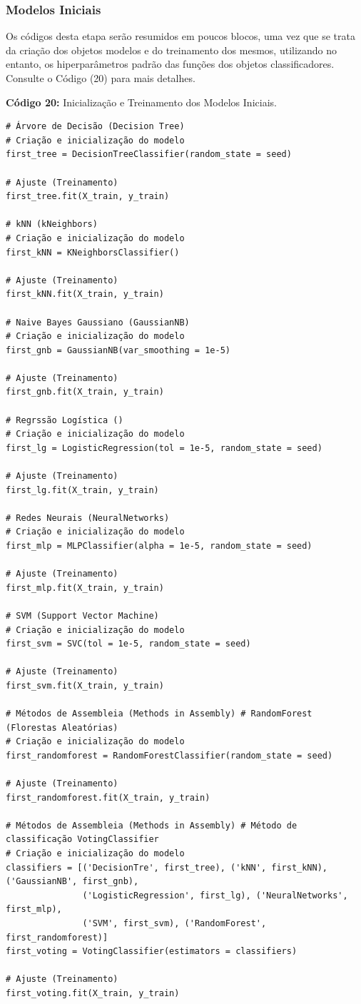 \documentclass[a4paper,12pt]{article} %
\begin{document}
\subsubsection{Modelos Iniciais} \label{section:3.4.1}
Os códigos desta etapa serão resumidos em poucos blocos, uma vez que se trata da criação dos objetos modelos e do treinamento dos mesmos, utilizando no entanto, os hiperparâmetros padrão das funções dos objetos classificadores. Consulte o Código (20) para mais detalhes.
\begin{center}
\textbf{Código 20:} Inicialização e Treinamento dos Modelos Iniciais.
\begin{verbatim}
# Árvore de Decisão (Decision Tree)
# Criação e inicialização do modelo
first_tree = DecisionTreeClassifier(random_state = seed)

# Ajuste (Treinamento)
first_tree.fit(X_train, y_train)

# kNN (kNeighbors)
# Criação e inicialização do modelo
first_kNN = KNeighborsClassifier()

# Ajuste (Treinamento)
first_kNN.fit(X_train, y_train)

# Naive Bayes Gaussiano (GaussianNB)
# Criação e inicialização do modelo
first_gnb = GaussianNB(var_smoothing = 1e-5)

# Ajuste (Treinamento)
first_gnb.fit(X_train, y_train)

# Regrssão Logística ()
# Criação e inicialização do modelo
first_lg = LogisticRegression(tol = 1e-5, random_state = seed)

# Ajuste (Treinamento)
first_lg.fit(X_train, y_train)

# Redes Neurais (NeuralNetworks)
# Criação e inicialização do modelo
first_mlp = MLPClassifier(alpha = 1e-5, random_state = seed)

# Ajuste (Treinamento)
first_mlp.fit(X_train, y_train)

# SVM (Support Vector Machine)
# Criação e inicialização do modelo
first_svm = SVC(tol = 1e-5, random_state = seed)

# Ajuste (Treinamento)
first_svm.fit(X_train, y_train)

# Métodos de Assembleia (Methods in Assembly) # RandomForest (Florestas Aleatórias)
# Criação e inicialização do modelo
first_randomforest = RandomForestClassifier(random_state = seed)

# Ajuste (Treinamento)
first_randomforest.fit(X_train, y_train)

# Métodos de Assembleia (Methods in Assembly) # Método de classificação VotingClassifier
# Criação e inicialização do modelo
classifiers = [('DecisionTre', first_tree), ('kNN', first_kNN), ('GaussianNB', first_gnb),
               ('LogisticRegression', first_lg), ('NeuralNetworks', first_mlp),
               ('SVM', first_svm), ('RandomForest', first_randomforest)]
first_voting = VotingClassifier(estimators = classifiers)

# Ajuste (Treinamento)
first_voting.fit(X_train, y_train)
\end{verbatim}
\end{center}
\end{document}
